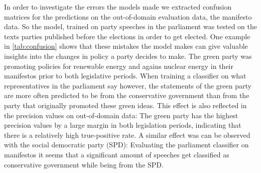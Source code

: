 \documentclass[runningheads,a4paper]{llncs}
\begin{document}
%
%
%
%
%
%
%
%
%
%

In order to investigate the errors the models made we extracted confusion matrices for the predictions on the out-of-domain evaluation data, the manifesto data. So the model, trained on party speeches in the parliament was tested on the texts parties published before the elections in order to get elected. One example in \autoref{tab:confusion} shows that these mistakes the model makes can give valuable insights into the changes in policy a party decides to make. The green party was promoting policies for renewable energy and agains nuclear energy in their manifestos prior to both legislative periods. When training a classifier on what representatives in the parliament say however, the statements of the green party are more often predicted to be from the conservative government than from the party that originally promoted these green ideas. This effect is also reflected in the precision values on out-of-domain data: The green party has the highest precision values by a large margin in both legislation periods, indicating that there is a relatively high true-positive rate. A similar effect was can be observed with the social democratic party (SPD): Evaluating the parliament classifier on manifestos it seems that a significant amount of speeches get classified as conservative government while being from the SPD. \\
\end{document}
